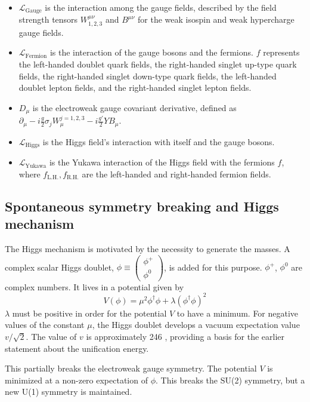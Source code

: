 \begin{itemize}
  \setlength\itemsep{0em}
  \item $\mathcal{L}_\mathrm{Gauge}$ is the interaction among the gauge fields, described by the field strength tensors $W_{1,2,3}^{\mu\nu}$ and $B^{\mu\nu}$ for the weak isospin and weak hypercharge gauge fields.
  \item $\mathcal{L}_\mathrm{Fermion}$ is the interaction of the gauge bosons and the fermions. $f$ represents the left-handed doublet quark fields, the right-handed singlet up-type quark fields, the right-handed singlet down-type quark fields, the left-handed doublet lepton fields, and the right-handed singlet lepton fields. 
  \item $D_\mu$ is the electroweak gauge covariant derivative, defined as 
    $\partial_\mu - i\frac{g}{2}\sigma_j W^{j=1,2,3}_{\mu} - i\frac{g'}{2} Y B_\mu $.
  \item $\mathcal{L}_\mathrm{Higgs}$ is the Higgs field's interaction with itself and the gauge bosons.
  \item $\mathcal{L}_\mathrm{Yukawa}$ is the Yukawa interaction of the Higgs field with the fermions $f$, where $f_\mathrm{L.H.}, f_\mathrm{R.H.}$ are the left-handed and right-handed fermion fields.
\end{itemize}

\subsection{Spontaneous symmetry breaking and Higgs mechanism}
\label{higgs}

The Higgs mechanism is motivated by the necessity to generate the masses.
A complex scalar Higgs doublet, $\phi \equiv \begin{pmatrix} \phi^+ \\ \phi^0 \end{pmatrix}$,
is added for this purpose. $\phi^+$, $\phi^0$ are complex numbers.
It lives in a potential given by 
\begin{equation}
V(\phi) = \mu^2 \phi^\dagger \phi + \lambda (\phi^\dagger \phi)^2 \label{eq:higgsV}
\end{equation}
$\lambda$ must be positive in order for the potential $V$ to have a minimum.
For negative values of the constant $\mu$, the Higgs doublet develops a vacuum expectation value $v/\sqrt{2}$.
The value of $v$ is approximately 246 \GeV, providing a basis for the earlier statement about the unification energy.

This partially breaks the electroweak gauge symmetry.  
The potential $V$ is minimized at a non-zero expectation of $\phi$.
This breaks the SU(2) symmetry, but a new U(1) symmetry is maintained.

